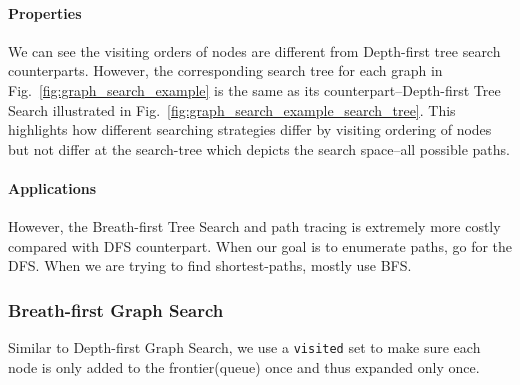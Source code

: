 \documentclass[../main.tex]{subfiles}
\begin{document}
\paragraph{Properties} We can see the visiting orders of nodes are different from Depth-first tree search counterparts. However, the corresponding search tree for each graph in Fig.~\ref{fig:graph_search_example} is the same as its counterpart--Depth-first Tree Search illustrated in Fig.~\ref{fig:graph_search_example_search_tree}. This highlights how different searching strategies differ by visiting ordering of nodes but not differ at the search-tree which depicts the search space--all possible paths. 






\paragraph{Applications} However, the Breath-first Tree Search and path tracing is extremely more costly compared with DFS counterpart. When our goal is to enumerate paths, go for the DFS. When we are trying to find shortest-paths, mostly use BFS. 

\subsubsection{Breath-first Graph Search}
Similar to Depth-first Graph Search, we use a \texttt{visited} set to make sure each node is only added to the frontier(queue) once and thus expanded only once. 
\end{document}
